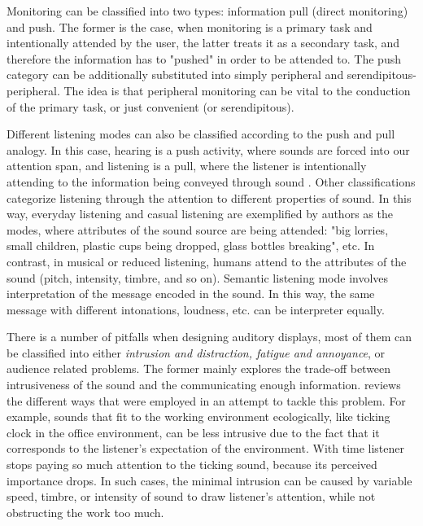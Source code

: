 Monitoring can be classified into two types: information pull (direct monitoring) and push. The former is the case, when monitoring is a primary task and intentionally attended by the user, the latter treats it as a secondary task, and therefore the information has to "pushed" in order to be attended to. The push category can be additionally substituted into simply peripheral and serendipitous-peripheral. The idea is that peripheral monitoring can be vital to the conduction of the primary task, or just convenient (or serendipitous).

Different listening modes can also be classified according to the push and pull analogy. In this case, hearing is a push activity, where sounds are forced into our attention span, and listening is a pull, where the listener is intentionally attending to the information being conveyed through sound \cite{hermann_sonification_2011}. Other classifications categorize listening through the attention to different properties of sound. In this way, everyday listening and casual listening are exemplified by authors as the modes, where attributes of the sound source are being attended: "big lorries, small children, plastic cups being dropped, glass bottles breaking", etc. In contrast, in musical or reduced listening, humans attend to the attributes of the sound (pitch, intensity, timbre, and so on). Semantic listening mode involves interpretation of the message encoded in the sound. In this way, the same message with different intonations, loudness, etc. can be interpreter equally.


There is a number of pitfalls when designing auditory displays, most of them can be classified into either \textit{intrusion and distraction, fatigue and annoyance}, or audience related problems.
The former mainly explores the trade-off between intrusiveness of the sound and the communicating enough information. \cite{hermann_sonification_2011} reviews the different ways that were employed in an attempt to tackle this problem. For example, sounds that fit to the working environment ecologically, like ticking clock in the office environment, can be less intrusive due to the fact that it corresponds to the listener's expectation of the environment. With time listener stops paying so much attention to the ticking sound, because its perceived importance drops. In such cases, the minimal intrusion can be caused by variable speed, timbre, or intensity of sound to draw listener's attention, while not obstructing the work too much.

